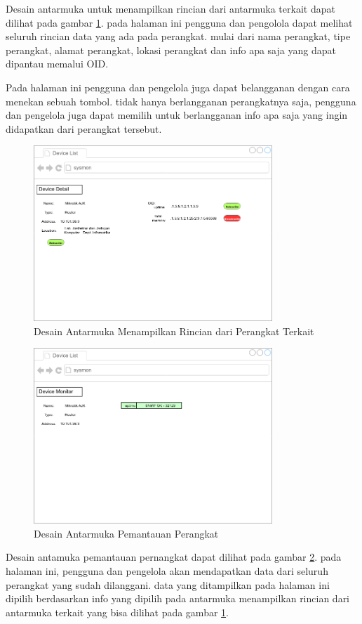         	Desain antarmuka untuk menampilkan rincian dari antarmuka terkait dapat dilihat pada gambar \ref{desain:antarmuka2}. pada halaman ini pengguna dan pengolola dapat melihat seluruh rincian data yang ada pada perangkat. mulai dari nama perangkat, tipe perangkat, alamat perangkat, lokasi perangkat dan info apa saja yang dapat dipantau memalui OID.
        	
        	Pada halaman ini pengguna dan pengelola juga dapat belangganan dengan cara menekan sebuah tombol. tidak hanya berlangganan perangkatnya saja, pengguna dan pengelola juga dapat memilih untuk berlangganan info apa saja yang ingin didapatkan dari perangkat tersebut.
	        \begin{figure}[H]
	        	\centering
	        	\includegraphics[width=9cm]{Images/C-3/antarmuka2.png}
	        	\caption{Desain Antarmuka Menampilkan Rincian dari Perangkat Terkait}
	        	\label{desain:antarmuka2}
	        \end{figure}
        
	        \begin{figure}[H]
	        	\centering
	        	\includegraphics[width=9cm]{Images/C-3/antarmuka3.png}
	        	\caption{Desain Antarmuka Pemantauan Perangkat}
	        	\label{desain:antarmuka3}
	        \end{figure}
        
        	Desain antamuka pemantauan pernangkat dapat dilihat pada gambar \ref{desain:antarmuka3}. pada halaman ini, pengguna dan pengelola akan mendapatkan data dari seluruh perangkat yang sudah dilanggani. data yang ditampilkan pada halaman ini dipilih berdasarkan info yang dipilih pada antarmuka menampilkan rincian dari antarmuka terkait yang bisa dilihat pada gambar \ref{desain:antarmuka2}.

